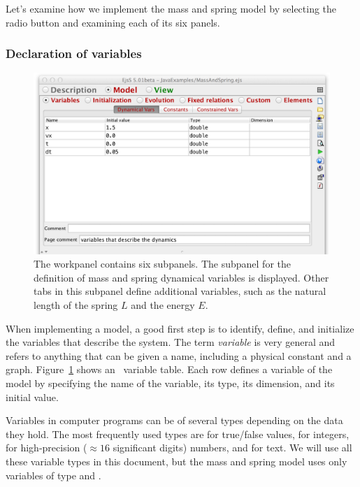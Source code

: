 Let's examine how we implement the mass and spring model by selecting the  radio button and examining each of
its six panels.

\subsubsection{Declaration of variables}
\begin{figure}[htb]
    \centering
  \includegraphics[scale=\scale]{02ExplorationJava/images/ModelVariables.png}
    \caption{The  workpanel contains six subpanels. The subpanel for the definition of mass and spring dynamical variables is displayed.  Other tabs in this subpanel define additional variables, such as the natural length of the spring $L$ and the energy $E$.} \label{fig:02ExplorationJava/ModelVariables}
\end{figure}

When implementing a model, a good first step is to identify, define, and initialize the variables that describe the
system. The term \emph{variable} is very general and refers to anything that can be given a name, including a
physical constant and a graph. Figure~\ref{fig:02ExplorationJava/ModelVariables} shows an
\ejs\ variable table. Each row defines a variable of the model by specifying the name of the variable, its type, its dimension, and its initial value.

Variables in computer programs can be of several types depending on the data they hold. The most frequently used types are  for true/false values,  for integers,  for high-precision ($\approx 16$ significant digits) numbers, and  for text.  We will use all these variable types in this document, but the mass and spring model uses only variables of type  and .

